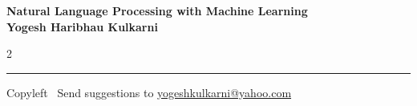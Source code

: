\documentclass[8pt,landscape]{article}
\begin{document}
\footnotesize


\begin{center}
\Large{\textbf{Natural Language Processing with Machine Learning\\ Yogesh Haribhau Kulkarni}}  
\end{center}

\begin{multicols}{2}

\end{multicols}

\rule{\linewidth}{0.25pt}
\scriptsize
Copyleft \textcopyleft\  Send suggestions to 
\href{http://yati.io}{yogeshkulkarni@yahoo.com}
\end{document}
